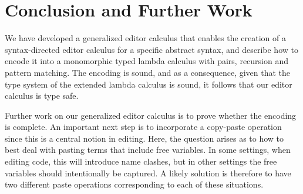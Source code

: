 \documentclass[sigplan,review]{acmart}
\begin{document}
\section{Conclusion and Further Work}

We have developed a generalized editor calculus that enables the
creation of a syntax-directed editor calculus for a specific abstract
syntax, and describe how to encode it into a monomorphic typed lambda
calculus with pairs, recursion and pattern matching. The encoding is
sound, and as a consequence, given that the type system of the
extended lambda calculus is sound, it follows that our editor calculus
is type safe.

Further work on our generalized editor calculus is to prove whether
the encoding is complete.  An important next step is to
incorporate a copy-paste operation since this is a central notion in
editing. Here, the question arises as to how to best deal with pasting
terms that include free variables. In some settings, when editing
code, this will introduce name clashes, but in other settings the free
variables should intentionally be captured. A likely solution is
therefore to have two different paste operations corresponding to each
of these situations.



\end{document}
